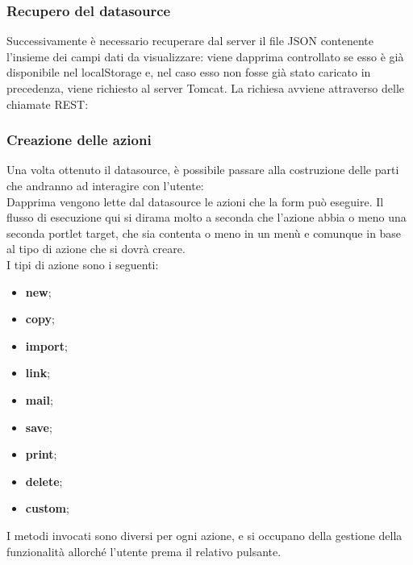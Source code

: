 \subsubsection{Recupero del datasource}
Successivamente è necessario recuperare dal server il file JSON contenente l'insieme dei campi dati da visualizzare: viene dapprima controllato se esso è già disponibile nel localStorage e, nel caso esso non fosse già stato caricato in precedenza, viene richiesto al server Tomcat.
La richiesa avviene attraverso delle chiamate REST: %
\subsubsection{Creazione delle azioni}
Una volta ottenuto il datasource, è possibile passare alla costruzione delle parti che andranno ad interagire con l'utente:\\
Dapprima vengono lette dal datasource le azioni che la form può eseguire. Il flusso di esecuzione qui si dirama molto a seconda che l'azione abbia o meno una seconda portlet target, che sia contenta o meno in un menù e comunque in base al tipo di azione che si dovrà creare.\\
I tipi di azione sono i seguenti:
\begin{itemize}
	\item \textbf{new};
	\item \textbf{copy};
	\item \textbf{import};
	\item \textbf{link};
	\item \textbf{mail};
	\item \textbf{save};
	\item \textbf{print};
	\item \textbf{delete};
	\item \textbf{custom};
\end{itemize}
I metodi invocati sono diversi per ogni azione, e si occupano della gestione della funzionalità allorché l'utente prema il relativo pulsante.
\newpage
